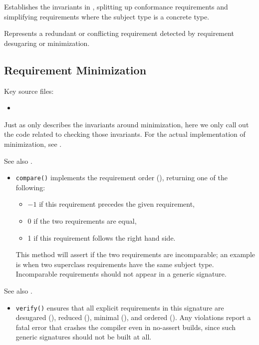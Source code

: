 \documentclass[../generics]{subfiles}
\begin{document}
Establishes the invariants in , splitting up conformance requirements and simplifying requirements where the subject type is a concrete type.

Represents a redundant or conflicting requirement detected by requirement desugaring or minimization.

\subsection*{Requirement Minimization}

Key source files:
\begin{itemize}
\item {}
\end{itemize}
Just as  only describes the invariants around minimization, here we only call out the code related to checking those invariants. For the actual implementation of minimization, see .

See also .
\begin{itemize}
\item \texttt{compare()} implements the requirement order (), returning one of the following:
\begin{itemize}
\item $-1$ if this requirement precedes the given requirement,
\item 0 if the two requirements are equal,
\item 1 if this requirement follows the right hand side.
\end{itemize}
This method will assert if the two requirements are incomparable; an example is when two superclass requirements have the same subject type. Incomparable requirements should not appear in a generic signature.
\end{itemize}

See also .
\begin{itemize}
\item \texttt{verify()} ensures that all explicit requirements in this signature are desugared (), reduced (), minimal (), and ordered (). Any violations report a fatal error that crashes the compiler even in no-assert builds, since such generic signatures should not be built at all.
\end{itemize}
\end{document}
